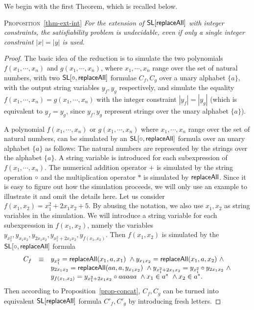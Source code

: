 We begin with the first Theorem, which is recalled below.

\medskip

\noindent \textsc{Proposition}~\ref{thm-ext-int}
{\em    
    For the extension of $\mathsf{SL}[\mathsf{replaceAll}]$ with \emph{integer constraints}, the satisfiability problem is undecidable, even if only a single integer constraint $|x| = |y|$ is used.
}


\begin{proof}
	The basic idea of the reduction is to simulate the two polynomials $f(x_1,\cdots, x_n)$ and $g(x_1,\cdots, x_n)$, where $x_1,\cdots,x_n$ range over the set of natural numbers, with two $\mathsf{SL}[\circ,\mathsf{replaceAll}]$ formulae $C_f, C_g$ over a unary alphabet $\{a\}$, with the output string variables $y_f, y_g$ respectively, and simulate the equality $f(x_1,\cdots, x_n) = g(x_1,\cdots, x_n)$ with the integer constraint $|y_f|=|y_g|$ (which is equivalent to $y_f = y_g$, since $y_f, y_g$ represent strings over the unary alphabet $\{a\}$). 
	
	A polynomial $f(x_1,\cdots, x_n)$ or $g(x_1,\cdots, x_n)$ where $x_1, \cdots, x_n$ range over the set of natural numbers, can be simulated by an $\mathsf{SL}[\circ,\mathsf{replaceAll}]$ formula over an unary alphabet $\{a\}$ as follows: The natural numbers are represented by the strings over the alphabet $\{a\}$. A string variable is introduced for each subexpression of $f(x_1,\cdots, x_n)$. The numerical addition operator $+$ is simulated by the string operation $\circ$ 
	and the multiplication operator $*$ is simulated by $\mathsf{replaceAll}$. Since it is easy to figure out how the simulation proceeds, we will only use an example to illustrate it and omit the details here. Let us consider $f(x_1,x_2) = x_1^2 + 2 x_1 x_2 + 5$. By abusing the notation, we also use $x_1,x_2$ as string variables in the simulation. We will introduce a string variable for each subexpression in $f(x_1,x_2)$, namely the variables $y_{x_1^2}, y_{x_1x_2}, y_{2x_1x_2}, y_{x_1^2+2x_1x_2}, y_{f(x_1,x_2)}$. Then $f(x_1,x_2)$ is simulated by the $\mathsf{SL}[\circ,\mathsf{replaceAll}]$ formula
	\[
	\begin{array} {l c l }
	C_f & \equiv & y_{x_1^2} = \replaceall(x_1,a, x_1)\ \wedge y_{x_1x_2} = \replaceall(x_1, a, x_2)\ \wedge \\
	& & y_{2x_1x_2} = \replaceall(aa, a, y_{x_1x_2})\ \wedge y_{x_1^2+2x_1x_2} = y_{x_1^2} \concat y_{2x_1x_2}\ \wedge  \\
	& & y_{f(x_1,x_2)}=y_{x_1^2+2x_1x_2} \concat a a a a a\ \wedge x_1 \in a^*\ \wedge x_2 \in a^*.
	\end{array}
	\]
	Then according to Proposition~\ref{prop-concat}, $C_f, C_g$ can be turned into equivalent $\mathsf{SL}[\mathsf{replaceAll}]$ formula $C'_f, C'_g$ by introducing fresh letters.
	

\end{proof}
